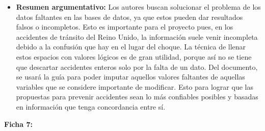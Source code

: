 \documentclass[12pt]{article}
\begin{document}
\begin{itemize}
	\item \textbf{Resumen argumentativo:} Los autores buscan solucionar el problema 
	de los datos faltantes en las bases de datos, ya que estos pueden dar resultados 
	falsos o incompletos. Esto es importante para el proyecto pues, en los accidentes 
	de tránsito del Reino Unido, la información suele venir incompleta debido a la 
	confusión que hay en el lugar del choque. La técnica de llenar estos espacios con 
	valores lógicos es de gran utilidad, porque así no se tiene que descartar accidentes 
	enteros solo por la falta de un dato. Del documento, se usará la guía para poder 
	imputar aquellos valores faltantes de aquellas variables que se considere importante 
	de modificar. Esto para lograr que las propuestas para prevenir accidentes sean lo más 
	confiables posibles y basadas en información que tenga concordancia entre sí.\\
\end{itemize}

\textbf{Ficha 7:}
\end{document}
